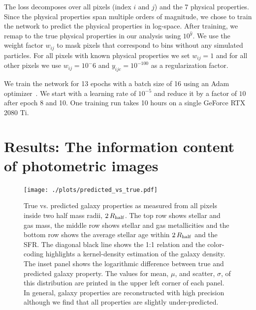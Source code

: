 \documentclass[useAMS,usenatbib]{mnras}
\begin{document}
The loss decomposes over all pixels (index $i$ and $j$) and the 7 physical properties. Since the physical properties span multiple orders of magnitude, we chose to train the network to predict the physical properties in log-space. After training, we remap to the true physical properties in our analysis using $10^{\hat{y}}$. We use the weight factor $w_{ij}$ to mask pixels that correspond to bins without any simulated particles. For all pixels with known physical properties we set $w_{ij}=1$ and for all other pixels we use $w_{ij} = 10^-6$ and $y_{ijc} = 10^{-100}$ as a regularization factor.

We train the network for 13 epochs with a batch size of 16 using an Adam optimizer~\cite{kingma2014adam}. We start with a learning rate of $10^{-5}$ and reduce it by a factor of $10$ after epoch 8 and 10. One training run takes 10 hours on a single GeForce RTX 2080 Ti.


\section{Results: The information content of photometric images}
\label{sec:results}

\begin{figure}
\vspace{-.4cm}
\begin{center}
\texttt{[image: ./plots/predicted\_vs\_true.pdf]}
\end{center}
\vspace{-.5cm}
\caption{True vs. predicted galaxy properties as measured from all pixels inside two half mass radii, $2\,R_{\rm half}$. The top row shows stellar and gas mass, the middle row shows stellar and gas metallicities and the bottom row shows the average stellar age within $2\,R_{\rm half}$ and the SFR. The diagonal black line shows the 1:1 relation and the color-coding highlights a kernel-density estimation of the galaxy density. The inset panel shows the logarithmic difference between true and predicted galaxy property. The values for mean, $\mu$, and scatter, $\sigma$, of this distribution are printed in the upper left corner of each panel. In general, galaxy properties are reconstructed with high precision although we find that all properties are slightly under-predicted.}
\label{fig:true_vs_pred}
\end{figure}
\end{document}
